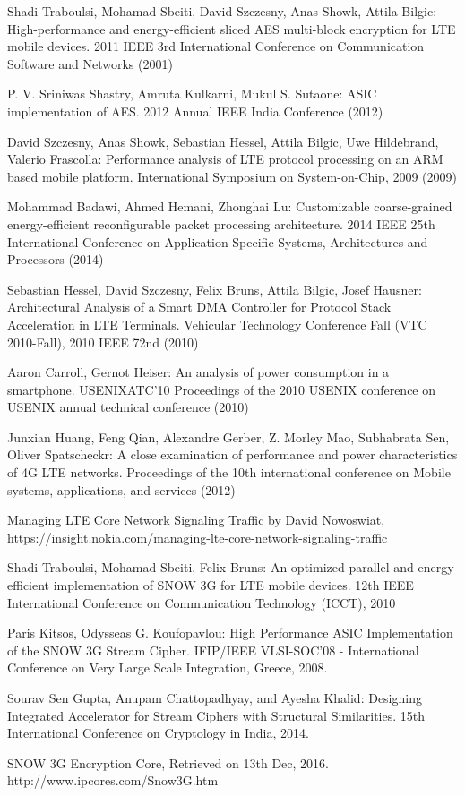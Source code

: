 \documentclass[lnicst,sechang,a4paper]{svmultln}
\begin{document}
\begin{thebibliography}{4}
 Shadi Traboulsi, Mohamad Sbeiti, David Szczesny, Anas Showk, Attila Bilgic: High-performance and energy-efficient sliced AES multi-block encryption for LTE mobile devices. 2011 IEEE 3rd International Conference on Communication Software and Networks (2001)


 P. V. Sriniwas Shastry, Amruta Kulkarni, Mukul S. Sutaone: ASIC implementation of AES. 2012 Annual IEEE India Conference  (2012)

 David Szczesny, Anas Showk, Sebastian Hessel, Attila Bilgic, Uwe Hildebrand, Valerio Frascolla: Performance analysis of LTE protocol processing on an ARM based mobile platform. International Symposium on System-on-Chip, 2009 (2009)


 Mohammad Badawi, Ahmed Hemani, Zhonghai Lu: Customizable coarse-grained energy-efficient reconfigurable packet processing architecture. 2014 IEEE 25th International Conference on Application-Specific Systems, Architectures and Processors (2014)

 Sebastian Hessel, David Szczesny, Felix Bruns, Attila Bilgic, Josef Hausner: Architectural Analysis of a Smart DMA Controller for Protocol Stack Acceleration in LTE Terminals. Vehicular Technology Conference Fall (VTC 2010-Fall), 2010 IEEE 72nd (2010)


 Aaron Carroll, Gernot Heiser: An analysis of power consumption in a smartphone. USENIXATC'10 Proceedings of the 2010 USENIX conference on USENIX annual technical conference (2010)


 Junxian Huang, Feng Qian, Alexandre Gerber, Z. Morley Mao, Subhabrata Sen, Oliver Spatscheckr: A close examination of performance and power characteristics of 4G LTE networks. Proceedings of the 10th international conference on Mobile systems, applications, and services (2012)

 Managing LTE Core Network Signaling Traffic by David Nowoswiat, https://insight.nokia.com/managing-lte-core-network-signaling-traffic

 Shadi Traboulsi, Mohamad Sbeiti, Felix Bruns: An optimized parallel and energy-efficient implementation of SNOW 3G for LTE mobile devices. 12th IEEE International Conference on Communication Technology (ICCT), 2010 

 Paris Kitsos, Odysseas G. Koufopavlou: High Performance ASIC Implementation of the SNOW 3G Stream Cipher. IFIP/IEEE VLSI-SOC’08 - International Conference on Very Large Scale Integration, Greece, 2008.

 Sourav Sen Gupta, Anupam Chattopadhyay, and Ayesha Khalid: Designing Integrated Accelerator for Stream Ciphers
with Structural Similarities. 15th International Conference on Cryptology in India, 2014.

 SNOW 3G Encryption Core, Retrieved on 13th Dec, 2016. http://www.ipcores.com/Snow3G.htm

\end{thebibliography}
\end{document}
